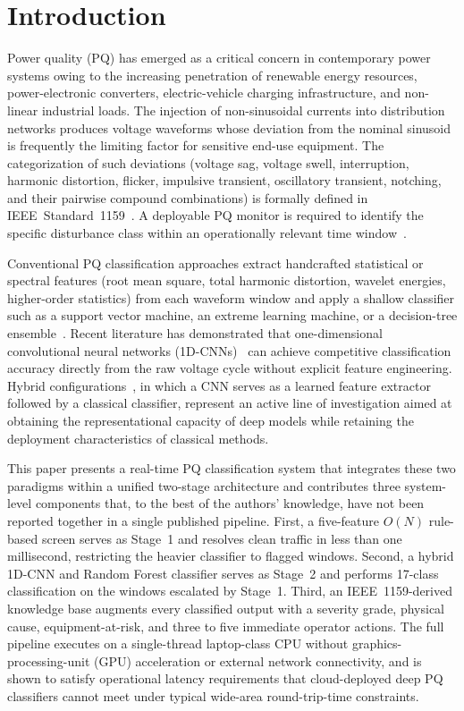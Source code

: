 \documentclass[conference]{IEEEtran}
\begin{document}
\section{Introduction}
Power quality (PQ) has emerged as a critical concern in contemporary
power systems owing to the increasing penetration of renewable energy
resources, power-electronic converters, electric-vehicle charging
infrastructure, and non-linear industrial loads. The injection of
non-sinusoidal currents into distribution networks produces voltage
waveforms whose deviation from the nominal sinusoid is frequently the
limiting factor for sensitive end-use equipment. The categorization of
such deviations (voltage sag, voltage swell, interruption, harmonic
distortion, flicker, impulsive transient, oscillatory transient,
notching, and their pairwise compound combinations) is formally
defined in IEEE~Standard~1159~\cite{ieee1159}. A deployable PQ monitor
is required to identify the specific disturbance class within an
operationally relevant time window~\cite{khetarpal2020review}.

Conventional PQ classification approaches extract handcrafted
statistical or spectral features (root mean square, total harmonic
distortion, wavelet energies, higher-order statistics) from each
waveform window and apply a shallow classifier such as a support
vector machine, an extreme learning machine, or a decision-tree
ensemble~\cite{thirumala2019ewt, sahani2021welm}. Recent literature
has demonstrated that one-dimensional convolutional neural networks
(1D-CNNs)~\cite{wang2020compressed, cai2020wigner, eristi2021lbp}
can achieve competitive classification accuracy directly from the
raw voltage cycle without explicit feature engineering. Hybrid
configurations~\cite{cai2021hybrid, garcia2020comparison}, in which
a CNN serves as a learned feature extractor followed by a classical
classifier, represent an active line of investigation aimed at
obtaining the representational capacity of deep models while
retaining the deployment characteristics of classical methods.

This paper presents a real-time PQ classification system that
integrates these two paradigms within a unified two-stage architecture
and contributes three system-level components that, to the best of the
authors' knowledge, have not been reported together in a single
published pipeline. First, a five-feature $O(N)$ rule-based screen
serves as Stage~1 and resolves clean traffic in less than one
millisecond, restricting the heavier classifier to flagged windows.
Second, a hybrid 1D-CNN and Random Forest classifier serves as Stage~2
and performs 17-class classification on the windows escalated by
Stage~1. Third, an IEEE~1159-derived knowledge base augments every
classified output with a severity grade, physical cause, equipment-at-risk,
and three to five immediate operator actions. The full pipeline executes
on a single-thread laptop-class CPU without graphics-processing-unit
(GPU) acceleration or external network connectivity, and is shown to
satisfy operational latency requirements that cloud-deployed deep PQ
classifiers cannot meet under typical wide-area round-trip-time
constraints.
\end{document}
